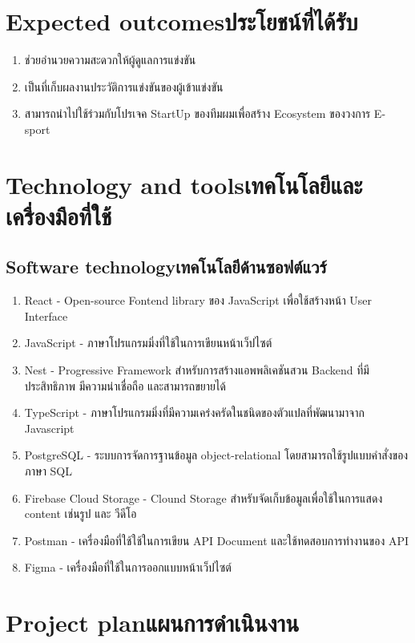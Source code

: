 \section{\ifenglish Expected outcomes\else ประโยชน์ที่ได้รับ\fi}
\begin{enumerate}
    \item ช่วยอำนวยความสะดวกให้ผู้ดูแลการแข่งขัน
    \item เป็นที่เก็บผลงานประวัติการแข่งขันของผู้เข้าแข่งขัน
    \item สามารถนำไปใช้ร่วมกับโปรเจค StartUp ของทีมผมเพื่อสร้าง Ecosystem ของวงการ E-sport
\end{enumerate}

\section{\ifenglish Technology and tools\else เทคโนโลยีและเครื่องมือที่ใช้\fi}

\subsection{\ifenglish Software technology\else เทคโนโลยีด้านซอฟต์แวร์\fi}
\begin{enumerate}
    \item React\cite{react} - Open-source Fontend library ของ JavaScript เพื่อใช้สร้างหน้า User Interface
    \item JavaScript\cite{javascript} - ภาษาโปรแกรมมิ่งที่ใช้ในการเขียนหน้าเว็ปไซต์
    \item Nest\cite{nest} - Progressive Framework สำหรับการสร้างแอพพลิเคชันสวน Backend ที่มีประสิทธิภาพ มีความน่าเชื่อถือ และสามารถขยายได้
    \item TypeScript\cite{typescript} - ภาษาโปรแกรมมิ่งที่มีความเคร่งครัดในชนิดของตัวแปลที่พัฒนามาจาก Javascript
    \item PostgreSQL\cite{postgresql} - ระบบการจัดการฐานข้อมูล object-relational โดยสามารถใช้รูปแบบคำสั่งของภาษา SQL
    \item Firebase Cloud Storage\cite{firebase} - Clound Storage สำหรับจัดเก็บข้อมูลเพื่อใช้ในการแสดง content เช่นรูป และ วีดีโอ
    \item Postman\cite{postman} - เครื่องมือที่ใช้ใช้ในการเขียน API Document และใช้ทดสอบการทำงานของ API
    \item Figma\cite{figma} - เครื่องมือที่ใช้ในการออกแบบหน้าเว็ปไซต์
\end{enumerate}

\section{\ifenglish Project plan\else แผนการดำเนินงาน\fi}

